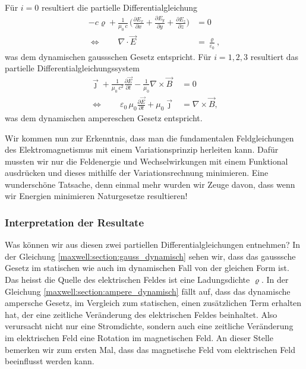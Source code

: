 Für $i=0$ resultiert die partielle Differentialgleichung
\begin{align}
-c\varrho + \frac{1}{\mu_0\,c}\,\biggl(\frac{\partial E_x}{\partial x}
+ \frac{\partial E_y}{\partial y} + \frac{\partial E_z}{\partial z}\biggr)
&=
0\\[1em]
\Leftrightarrow \qquad \nabla\cdot\vec{E}
&=
\frac{\varrho}{\varepsilon_0},
\label{maxwell:section:gauss_dynamisch}
\end{align}
was dem dynamischen gaussschen Gesetz entspricht.
Für $i=1,2,3$ resultiert das partielle Differentialgleichungssystem
\begin{align}
\vec{\jmath} + \frac{1}{\mu_0\,c^2}\frac{\partial \vec{E}}{\partial t}
- \frac{1}{\mu_0}\nabla\times\vec{B}
&=
0\\[1em]
\Leftrightarrow \qquad \varepsilon_0\,\mu_0\frac{\partial \vec{E}}{\partial t} + \mu_0\vec{\jmath}
&=
\nabla\times\vec{B},
\label{maxwell:section:ampere_dynamisch}
\end{align}
was dem dynamischen ampereschen Gesetz entspricht.
 
Wir kommen nun zur Erkenntnis, dass man die fundamentalen Feldgleichungen des Elektromagnetismus mit einem Variationsprinzip herleiten kann.
Dafür mussten wir nur die Feldenergie und Wechselwirkungen mit einem Funktional ausdrücken und dieses mithilfe der Variationsrechnung minimieren.
Eine wunderschöne Tatsache, denn einmal mehr wurden wir Zeuge davon, dass wenn wir Energien minimieren Naturgesetze resultieren!

\subsubsection{Interpretation der Resultate}
Was können wir aus diesen zwei partiellen Differentialgleichungen entnehmen?
In der Gleichung \eqref{maxwell:section:gauss_dynamisch} sehen wir, dass das gausssche Gesetz im statischen wie auch im dynamischen Fall von der gleichen Form ist.
Das heisst die Quelle des elektrischen Feldes ist eine Ladungsdichte $\varrho$.
In der Gleichung \eqref{maxwell:section:ampere_dynamisch} fällt auf, dass das dynamische ampersche Gesetz, im Vergleich zum statischen, einen zusätzlichen Term erhalten hat, der eine zeitliche Veränderung des elektrischen Feldes beinhaltet.
Also verursacht nicht nur eine Stromdichte, sondern auch eine zeitliche Veränderung im elektrischen Feld eine Rotation im magnetischen Feld. An dieser Stelle bemerken wir zum ersten Mal, dass das magnetische Feld vom elektrischen Feld beeinflusst werden kann.




